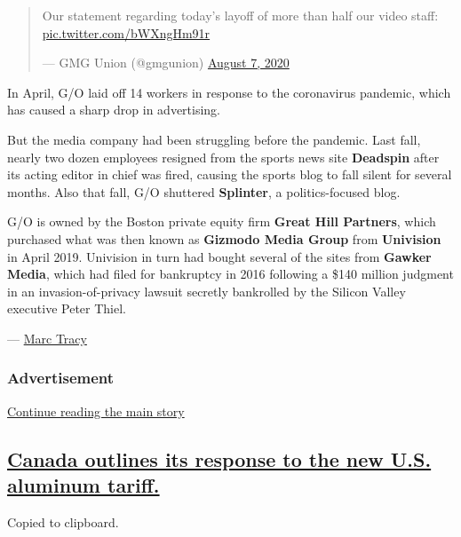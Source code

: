 \begin{quote}
Our statement regarding today's layoff of more than half our video
staff: \href{https://t.co/bWXngHm91r}{pic.twitter.com/bWXngHm91r}

--- GMG Union (@gmgunion)
\href{https://twitter.com/gmgunion/status/1291858333868097542?ref_src=twsrc\%5Etfw}{August
7, 2020}
\end{quote}

In April, G/O laid off 14 workers in response to the coronavirus
pandemic, which has caused a sharp drop in advertising.

But the media company had been struggling before the pandemic. Last
fall, nearly two dozen employees resigned from the sports news site
\textbf{Deadspin} after its acting editor in chief was fired, causing
the sports blog to fall silent for several months. Also that fall, G/O
shuttered \textbf{Splinter}, a politics-focused blog.

G/O is owned by the Boston private equity firm \textbf{Great Hill
Partners}, which purchased what was then known as \textbf{Gizmodo Media
Group} from \textbf{Univision} in April 2019. Univision in turn had
bought several of the sites from \textbf{Gawker Media}, which had filed
for bankruptcy in 2016 following a \$140 million judgment in an
invasion-of-privacy lawsuit secretly bankrolled by the Silicon Valley
executive Peter Thiel.

--- \href{https://www.nytimes3xbfgragh.onion/by/marc-tracy}{Marc Tracy}

\hypertarget{advertisement}{%
\subsubsection{Advertisement}\label{advertisement}}

\protect\hyperlink{after-dfp-ad-mid1}{Continue reading the main story}

\hypertarget{canada-outlines-its-response-to-the-new-us-aluminum-tariff}{%
\subsection{\texorpdfstring{\protect\hyperlink{canada-outlines-its-response-to-the-new-us-aluminum-tariff}{Canada
outlines its response to the new U.S. aluminum
tariff.}}{Canada outlines its response to the new U.S. aluminum tariff.}}\label{canada-outlines-its-response-to-the-new-us-aluminum-tariff}}

Copied to clipboard.

